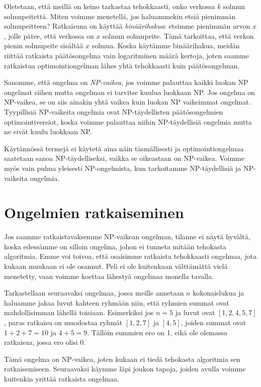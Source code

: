 Oletetaan, että meillä on keino tarkastaa tehokkaasti,
onko verkossa $k$ solmun solmupeitettä.
Miten voimme menetellä, jos haluammekin etsiä pienimmän
solmupeitteen?
Ratkaisuna on käyttää \emph{binäärihakua}:
etsimme pienimmän arvon $x$, jolle pätee,
että verkossa on $x$ solmun solmupeite.
Tämä tarkoittaa, että verkon pienin solmupeite
sisältää $x$ solmua.
Koska käytämme binäärihakua, meidän riittää ratkaista
päätösongelma vain logaritminen mää\-rä kertoja,
joten saamme ratkaistua optimointiongelman lähes yhtä
tehokkaasti kuin päätösongelman.


Sanomme, että ongelma on \emph{NP-vaikea}, jos voimme palauttaa
kaikki luokan NP ongelmat siihen mutta ongelman ei
tarvitse kuulua luokkaan NP.
Jos ongelma on NP-vaikea, se on siis ainakin yhtä vaikea
kuin luokan NP vaikeimmat ongelmat.
Tyypillisiä NP-vaikeita ongelmia ovat NP-täydellisten
päätösongelmien optimointiversiot,
koska voimme palauttaa niihin NP-täy\-dellisiä ongelmia
mutta ne eivät kuulu luokkaan NP.

Käytännössä termejä ei käytetä aina näin täsmällisesti
ja optimointiongelmaa saatetaan sanoa NP-täydelliseksi,
vaikka se oikeastaan on NP-vaikea.
Voimme myös vain puhua yleisesti NP-ongelmista,
kun tarkoitamme NP-täydellisiä ja NP-vaikeita ongelmia.

\section{Ongelmien ratkaiseminen}

Jos saamme ratkaistavaksemme NP-vaikean ongelman,
tilanne ei näytä hy\-vältä, koska edessämme on silloin ongelma,
johon ei tunneta mitään tehokasta algoritmia.
Emme voi toivoa, että osaisimme ratkaista tehokkaasti ongelmaa,
jota kukaan muukaan ei ole osannut.
Peli ei ole kuitenkaan välttämättä vielä menetetty,
vaan voimme koettaa lähestyä ongelmaa monella tavalla.

Tarkastellaan seuraavaksi ongelmaa, jossa meille annetaan $n$
kokonaislukua ja haluamme jakaa luvut kahteen ryhmään niin,
että ryhmien summat ovat mahdollisimman lähellä toisiaan.
Esimerkiksi jos $n=5$ ja luvut ovat $[1,2,4,5,7]$,
paras ratkaisu on muodostaa ryhmät $[1,2,7]$ ja $[4,5]$,
joiden summat ovat $1+2+7=10$ ja $4+5=9$.
Tällöin summien ero on 1,
eikä ole olemassa ratkaisua, jossa ero olisi 0.

Tämä ongelma on NP-vaikea, joten kukaan ei tiedä tehokasta
algoritmia sen ratkaisemiseen.
Seuraavaksi käymme läpi joukon tapoja, joiden avulla
voimme kuitenkin yrittää ratkaista ongelmaa.

